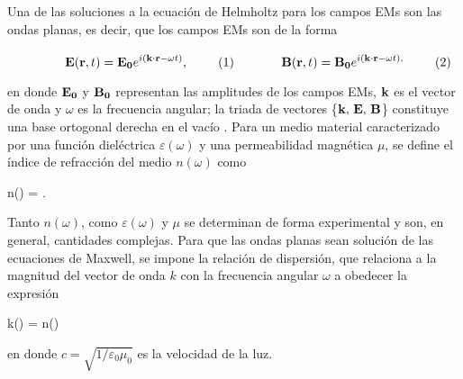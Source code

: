 \noindent Una de las soluciones a la ecuación de Helmholtz para los campos EMs son las ondas planas, es decir, que los campos EMs son de la forma \cite{jackson1999electrodynamics} 

	\begin{subequations}\eqhalf{\vb{E}(\vb{r},t) =\vb{E_0}e^{i(\vb{k}\cdot\vb{r} -\omega t)},}
	\eqhalf{\vb{B}(\vb{r}, t) =\vb{B_0}e^{i(\vb{k}\cdot\vb{r} -\omega t),}}	
	\label{eqs:ondasPlanas}\end{subequations}\vspace*{-1em}
		
\noindent en donde  $\vb{E_0}$ y $\vb{B_0}$ representan las amplitudes de los campos EMs, $\vb{k}$ es el vector de onda y $\omega$ es la frecuencia angular; la triada de vectores \{$\vb{k},\, \vb{E},\, \vb{B}$\} constituye una base ortogonal derecha en el vacío \cite{griffiths2013electrodynamics}. Para un medio material caracterizado por una función dieléctrica $\varepsilon(\omega)$ y una permeabilidad magnética $\mu$, se define el índice de refracción del medio $n(\omega)$ como \vspace*{-.75em}
%
	\begin{tcolorbox}[title = Índice de refracción, ams align]
	n(\omega) = .
		\label{eq:indice} 
	\end{tcolorbox}\vspace*{-.75em}\noindent
%
Tanto $n(\omega)$, como $\varepsilon(\omega)$ y $\mu$ se determinan de forma experimental y son, en general, cantidades complejas. Para que las ondas planas sean solución de las ecuaciones de Maxwell, se impone la relación de dispersión, que relaciona a  la magnitud del vector de onda $k$ con la frecuencia angular $\omega$ a obedecer la expresión \vspace*{-.75em}
%
	\begin{tcolorbox}[title = Relación de dispersión, ams align]
	k(\omega) = n(\omega)
	\label{eq:dispersion}
	\end{tcolorbox}\vspace*{-.75em}\noindent
%
en donde  $c=\sqrt{1/\varepsilon_0\mu_0}$ es la velocidad de la luz.

